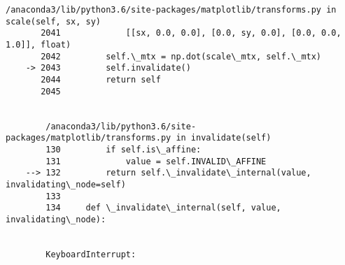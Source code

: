 \documentclass[11pt]{article}
\begin{document}
\begin{Verbatim}[commandchars=\\\{\}]
        /anaconda3/lib/python3.6/site-packages/matplotlib/transforms.py in scale(self, sx, sy)
       2041             [[sx, 0.0, 0.0], [0.0, sy, 0.0], [0.0, 0.0, 1.0]], float)
       2042         self.\_mtx = np.dot(scale\_mtx, self.\_mtx)
    -> 2043         self.invalidate()
       2044         return self
       2045 


        /anaconda3/lib/python3.6/site-packages/matplotlib/transforms.py in invalidate(self)
        130         if self.is\_affine:
        131             value = self.INVALID\_AFFINE
    --> 132         return self.\_invalidate\_internal(value, invalidating\_node=self)
        133 
        134     def \_invalidate\_internal(self, value, invalidating\_node):


        KeyboardInterrupt: 

    \end{Verbatim}

    \begin{center}
    \end{center}
    { \hspace*{\fill} \\}
    
\end{document}

